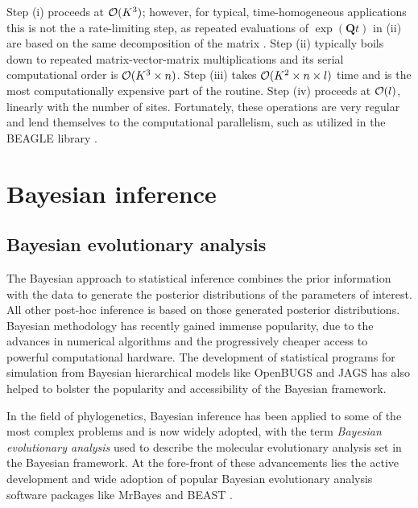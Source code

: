 Step (i) proceeds at ${\cal{O}}(K^3)$; however, for typical, time-homogeneous applications this is not the a rate-limiting step, as repeated evaluations of $\exp(\mathbf{Q}t)$ in (ii) are based on the same decomposition of the matrix \citep{Suchard2009}. 
Step (ii) typically boils down to repeated matrix-vector-matrix multiplications and its serial computational order is ${\cal{O}}(K^3 \times n)$. 
Step (iii) takes ${\cal{O}}(K^2 \times n \times l)$ time and is the most computationally expensive part of the routine. 
Step (iv) proceeds at ${\cal{O}}(l)$, linearly with the number of sites.
Fortunately, these operations are very regular and lend themselves to the computational parallelism, such as utilized in the BEAGLE library \citep{Suchard2009,Ayres2012}.


\section{Bayesian inference\label{sec:bayesian_inference}}

\subsection{Bayesian evolutionary analysis}

The Bayesian approach to statistical inference combines the prior information with the data to generate the posterior distributions of the parameters of interest.
All other post-hoc inference is based on those generated posterior distributions.
Bayesian methodology has recently gained immense popularity, due to the advances in numerical algorithms and the progressively cheaper access to powerful computational hardware.
The development of statistical programs for simulation from Bayesian hierarchical models like OpenBUGS \citep{Lunn2009} and JAGS \citep{Plummer2003} has also helped to bolster the popularity and accessibility of the Bayesian framework.

In the field of phylogenetics, Bayesian inference has been applied to some of the most complex problems and is now widely adopted, with the term \emph{Bayesian evolutionary analysis} used to describe the molecular evolutionary analysis set in the Bayesian framework.
At the fore-front of these advancements lies the active development and wide adoption of popular Bayesian evolutionary analysis software packages like MrBayes \citep{Ronquist2012} and BEAST \citep{Drummond2012}.

